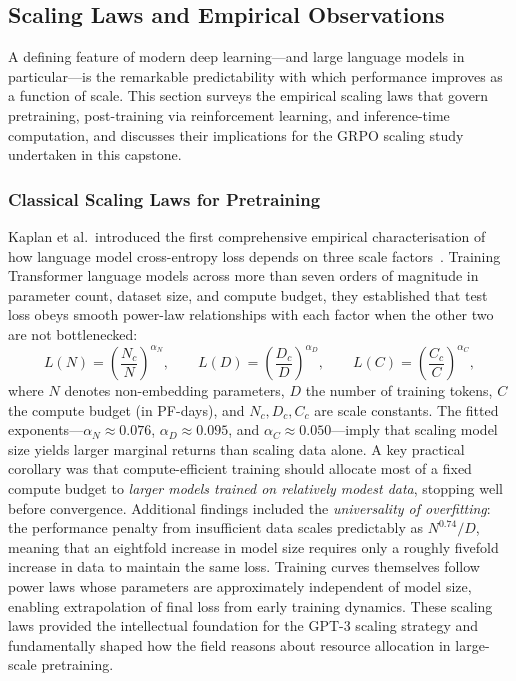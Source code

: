 \subsection{Scaling Laws and Empirical Observations}
\label{sec:scaling-laws}

A defining feature of modern deep learning---and large language models in
particular---is the remarkable predictability with which performance improves as
a function of scale.  This section surveys the empirical scaling laws that
govern pretraining, post-training via reinforcement learning, and inference-time
computation, and discusses their implications for the GRPO scaling study
undertaken in this capstone.

\subsubsection{Classical Scaling Laws for Pretraining}

Kaplan et al.\ introduced the first comprehensive empirical characterisation of
how language model cross-entropy loss depends on three scale
factors~\cite{kaplan2020scaling}.  Training Transformer language models across
more than seven orders of magnitude in parameter count, dataset size, and
compute budget, they established that test loss obeys smooth power-law
relationships with each factor when the other two are not bottlenecked:
\begin{equation}
  L(N) = \left(\frac{N_c}{N}\right)^{\!\alpha_N}\!,\qquad
  L(D) = \left(\frac{D_c}{D}\right)^{\!\alpha_D}\!,\qquad
  L(C) = \left(\frac{C_c}{C}\right)^{\!\alpha_C}\!,
  \label{eq:kaplan-power-laws}
\end{equation}
where $N$ denotes non-embedding parameters, $D$ the number of training tokens,
$C$ the compute budget (in PF-days), and $N_c, D_c, C_c$ are scale constants.
The fitted exponents---$\alpha_N \approx 0.076$, $\alpha_D \approx 0.095$, and
$\alpha_C \approx 0.050$---imply that scaling model size yields larger marginal
returns than scaling data alone.  A key practical corollary was that
compute-efficient training should allocate most of a fixed compute budget to
\emph{larger models trained on relatively modest data}, stopping well before
convergence.  Additional findings included the \emph{universality of
overfitting}: the performance penalty from insufficient data scales predictably
as $N^{0.74}/D$, meaning that an eightfold increase in model size requires only
a roughly fivefold increase in data to maintain the same loss.  Training curves
themselves follow power laws whose parameters are approximately independent of
model size, enabling extrapolation of final loss from early training dynamics.
These scaling laws provided the intellectual foundation for the GPT-3 scaling
strategy and fundamentally shaped how the field reasons about resource
allocation in large-scale pretraining.

